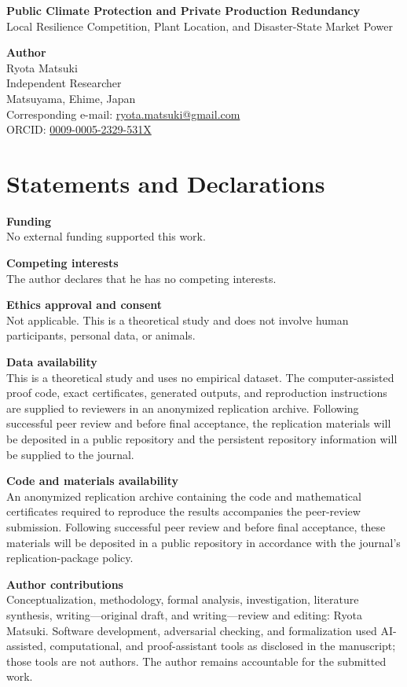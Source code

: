 \documentclass[11pt]{article}
\begin{document}
\begin{center}
{\Large\bfseries Public Climate Protection and Private Production Redundancy}\\[4pt]
{\large Local Resilience Competition, Plant Location, and Disaster-State Market Power}
\end{center}

\vspace{1em}

\noindent\textbf{Author}\\
Ryota Matsuki\\
Independent Researcher\\
Matsuyama, Ehime, Japan\\
Corresponding e-mail: \href{mailto:ryota.matsuki@gmail.com}{ryota.matsuki@gmail.com}\\
ORCID: \href{https://orcid.org/0009-0005-2329-531X}{0009-0005-2329-531X}

\section*{Statements and Declarations}

\noindent\textbf{Funding}\\
No external funding supported this work.

\medskip
\noindent\textbf{Competing interests}\\
The author declares that he has no competing interests.

\medskip
\noindent\textbf{Ethics approval and consent}\\
Not applicable. This is a theoretical study and does not involve human participants, personal data, or animals.

\medskip
\noindent\textbf{Data availability}\\
This is a theoretical study and uses no empirical dataset. The computer-assisted proof code, exact certificates, generated outputs, and reproduction instructions are supplied to reviewers in an anonymized replication archive. Following successful peer review and before final acceptance, the replication materials will be deposited in a public repository and the persistent repository information will be supplied to the journal.

\medskip
\noindent\textbf{Code and materials availability}\\
An anonymized replication archive containing the code and mathematical certificates required to reproduce the results accompanies the peer-review submission. Following successful peer review and before final acceptance, these materials will be deposited in a public repository in accordance with the journal's replication-package policy.

\medskip
\noindent\textbf{Author contributions}\\
Conceptualization, methodology, formal analysis, investigation, literature synthesis, writing---original draft, and writing---review and editing: Ryota Matsuki. Software development, adversarial checking, and formalization used AI-assisted, computational, and proof-assistant tools as disclosed in the manuscript; those tools are not authors. The author remains accountable for the submitted work.
\end{document}
